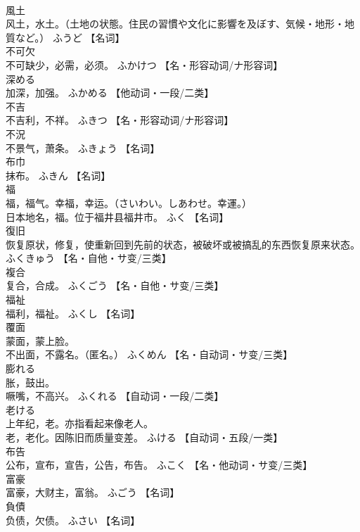 \documentclass[8pt]{extreport}
\begin{document}
\begin{CJK}{UTF8}{min}
\\	風土	
\\	风土，水土。（土地の状態。住民の習慣や文化に影響を及ぼす、気候・地形・地質など。）	ふうど		【名词】
\\	不可欠	
\\	不可缺少，必需，必须。	ふかけつ		【名・形容动词/ナ形容词】
\\	深める	
\\	加深，加强。	ふかめる		【他动词・一段/二类】
\\	不吉	
\\	不吉利，不祥。	ふきつ		【名・形容动词/ナ形容词】
\\	不況	
\\	不景气，萧条。	ふきょう		【名词】
\\	布巾	
\\	抹布。	ふきん		【名词】
\\	福	
\\	福，福气。幸福，幸运。（さいわい。しあわせ。幸運。） 
\\	日本地名，福。位于福井县福井市。	ふく		【名词】
\\	復旧	
\\	恢复原状，修复，使重新回到先前的状态，被破坏或被搞乱的东西恢复原来状态。	ふくきゅう		【名・自他・サ变/三类】
\\	複合	
\\	复合，合成。	ふくごう		【名・自他・サ变/三类】
\\	福祉	
\\	福利，福祉。	ふくし		【名词】
\\	覆面	
\\	蒙面，蒙上脸。 
\\	不出面，不露名。（匿名。）	ふくめん		【名・自动词・サ变/三类】
\\	膨れる	
\\	胀，鼓出。 
\\	噘嘴，不高兴。	ふくれる		【自动词・一段/二类】
\\	老ける	
\\	上年纪，老。亦指看起来像老人。 
\\	老，老化。因陈旧而质量变差。	ふける		【自动词・五段/一类】
\\	布告	
\\	公布，宣布，宣告，公告，布告。	ふこく		【名・他动词・サ变/三类】
\\	富豪	
\\	富豪，大财主，富翁。	ふごう		【名词】
\\	負債	
\\	负债，欠债。	ふさい		【名词】

\end{CJK}
\end{document}
